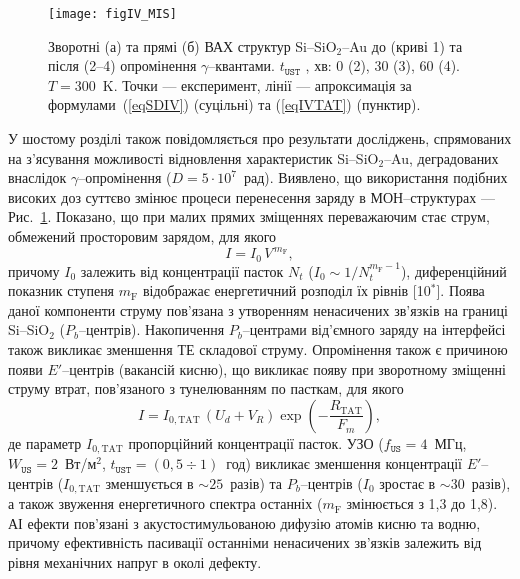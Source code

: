 \begin{figure}[b]
\center
\texttt{[image: figIV\_MIS]}%
\caption{\label{figIV_MIS}
Зворотні (а) та прямі (б) ВАХ структур Si--SiO$_2$--Au до (криві 1)
та після (2--4) опромінення $\gamma$--квантами.
$t_\mathtt{UST}$ , хв: 0 (2), 30 (3), 60 (4).
$T=300$~K.
Точки --- експеримент,
лінії --- апроксимація за формулами~(\ref{eqSDIV}) (суцільні) та (\ref{eqIVTAT}) (пунктир).
}%
\end{figure}
У шостому розділі також повідомляється про результати досліджень, спрямованих на з'ясування можливості відновлення характеристик Si--SiO$_2$--Au,
деградованих внаслідок $\gamma$--опромінення ($D=5\cdot10^7$~рад).
Виявлено, що використання подібних високих доз суттєво змінює процеси перенесення заряду в МОН--структурах --- Рис.~\ref{figIV_MIS}.
Показано, що при малих прямих зміщеннях переважаючим стає струм, обмежений просторовим зарядом, для якого
\begin{equation}\label{eqVIsclc}
  I=I_0\,V^{\,m_\mathrm{F}},
\end{equation}
причому $I_0$ залежить від концентрації пасток $N_t$ ($I_0\sim 1/N_t^{m_\mathrm{F}-1}$),
диференційний показник ступеня $m_\mathrm{F}$ відображає енергетичний розподіл їх рівнів
[10$^*$].
Поява даної компоненти струму пов'язана з утворенням ненасичених зв'язків на границі Si--SiO$_2$ ($P_b$--центрів).
Накопичення $P_b$--центрами від'ємного заряду на інтерфейсі також викликає зменшення ТЕ складової струму.
Опромінення також є причиною появи $E'$--центрів (вакансій кисню), що
викликає появу при зворотному зміщенні струму втрат, пов'язаного з тунелюванням по пасткам, для якого
\begin{equation}\label{eqIVTAT}
  I=I_{0,\mathrm{TAT}}\,(U_d+V_R)\exp\left(-\frac{R_\mathrm{TAT}}{F_m}\right),
\end{equation}
де параметр $I_{0,\mathrm{TAT}}$ пропорційний концентрації пасток.
УЗО
($f_\mathtt{US}=4$~МГц, $W_\mathtt{US}=2$~Вт/м$^2$, $t_\mathtt{UST}=(0,5\div1)$~год) викликає зменшення концентрації
$E'$--центрів ($I_{0,\mathrm{TAT}}$ зменшується в $\sim25$~разів) та  $P_b$--центрів ($I_0$ зростає в $\sim30$~разів),
а також звуження енергетичного спектра останніх ($m_\mathrm{F}$ змінюється з 1,3 до 1,8).
АІ ефекти пов'язані з акустостимульованою дифузію  атомів кисню та водню, причому ефективність пасивації останніми ненасичених зв'язків залежить
від рівня механічних напруг в околі дефекту.



